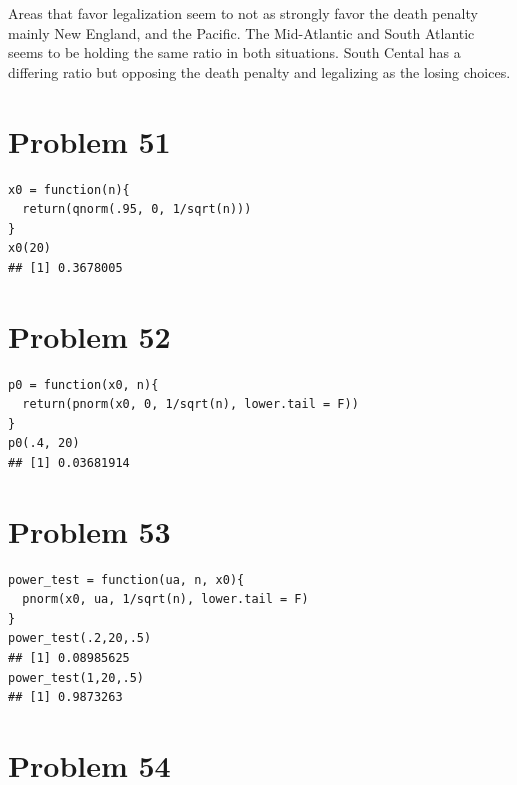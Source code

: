 \documentclass{article}\usepackage[]{graphicx}\usepackage[]{color}
\makeatletter
\newenvironment{kframe}{%
 \def\at@end@of@kframe{}%
 \ifinner\ifhmode%
  \def\at@end@of@kframe{\end{minipage}}%
  \begin{minipage}{\columnwidth}%
 \fi\fi%
 \def\FrameCommand##1{\hskip\@totalleftmargin \hskip-\fboxsep
 \colorbox{shadecolor}{##1}\hskip-\fboxsep
     \hskip-\linewidth \hskip-\@totalleftmargin \hskip\columnwidth}%
 \MakeFramed {\advance\hsize-\width
   \@totalleftmargin\z@ \linewidth\hsize
   \@setminipage}}%
 {\par\unskip\endMakeFramed%
 \at@end@of@kframe}
\newenvironment{knitrout}{}{} %
\makeatother
\begin{document}
Areas that favor legalization seem to not as strongly favor the death penalty mainly New England, and the Pacific. The Mid-Atlantic and South Atlantic seems to be holding the same ratio in both situations. South Cental has a differing ratio but opposing the death penalty and legalizing as the losing choices. 
\section*{Problem 51}
\begin{knitrout}
\color{fgcolor}\begin{kframe}
\begin{verbatim}
x0 = function(n){
  return(qnorm(.95, 0, 1/sqrt(n)))
}
x0(20)
## [1] 0.3678005
\end{verbatim}
\end{kframe}
\end{knitrout}
\section*{Problem 52}
\begin{knitrout}
\color{fgcolor}\begin{kframe}
\begin{verbatim}
p0 = function(x0, n){
  return(pnorm(x0, 0, 1/sqrt(n), lower.tail = F))
}
p0(.4, 20)
## [1] 0.03681914
\end{verbatim}
\end{kframe}
\end{knitrout}

\section*{Problem 53}
\begin{knitrout}
\color{fgcolor}\begin{kframe}
\begin{verbatim}
power_test = function(ua, n, x0){
  pnorm(x0, ua, 1/sqrt(n), lower.tail = F)
}
power_test(.2,20,.5)
## [1] 0.08985625
power_test(1,20,.5)
## [1] 0.9873263
\end{verbatim}
\end{kframe}
\end{knitrout}

\section*{Problem 54}
\end{document}
